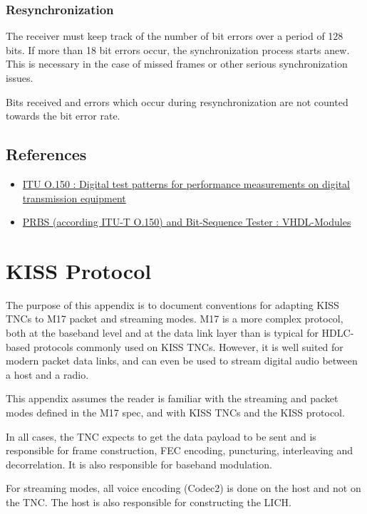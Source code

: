 \documentclass[a4paper,11pt]{book}
\begin{document}
\subsection{Resynchronization}

The receiver must keep track of the number of bit errors over a period of 128 bits. If more than 18 bit errors occur, the synchronization process starts anew. This is necessary in the case of missed frames or other serious synchronization issues.

Bits received and errors which occur during resynchronization are not counted towards the bit error rate.

\section{References}

\begin{itemize}
	\item
	\href{http://www.itu.int/rec/T-REC-O.150-199210-S}{ITU O.150 : Digital 	test patterns for performance measurements on digital transmission 	equipment}
	\item
	\href{http://www.pldworld.com/_hdl/5/-thorsten-gaertner.de/vhdl/PRBS.pdf}{PRBS
	(according ITU-T O.150) and Bit-Sequence Tester : VHDL-Modules}
\end{itemize}

\chapter{KISS Protocol}

The purpose of this appendix is to document conventions for adapting KISS TNCs to M17 packet and streaming modes. M17 is a more complex protocol, both at the baseband level and at the data link layer than is typical for HDLC-based protocols commonly used on KISS TNCs. However, it is well suited for modern packet data links, and can even be used to stream digital audio between a host and a radio.

This appendix assumes the reader is familiar with the streaming and packet modes defined in the M17 spec, and with KISS TNCs and the KISS protocol.

In all cases, the TNC expects to get the data payload to be sent and is responsible for frame construction, FEC encoding, puncturing, interleaving and decorrelation. It is also responsible for baseband modulation.

For streaming modes, all voice encoding (Codec2) is done on the host and not on the TNC. The host is also responsible for constructing the LICH.
\end{document}
